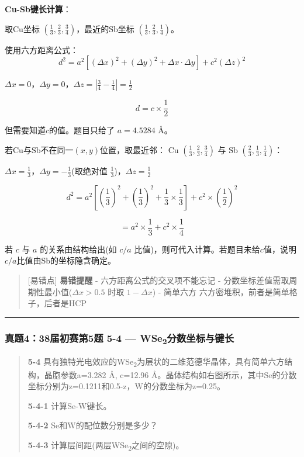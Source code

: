 \textbf{Cu-Sb键长计算}：

取Cu坐标 \((\frac{1}{3}, \frac{2}{3}, \frac{3}{4})\)，最近的Sb坐标 \((\frac{1}{3}, \frac{2}{3}, \frac{1}{4})\)。

使用六方距离公式：
\[d^2 = a^2[(\Delta x)^2 + (\Delta y)^2 + \Delta x \cdot \Delta y] + c^2(\Delta z)^2\]

\(\Delta x = 0\)，\(\Delta y = 0\)，\(\Delta z = |\frac{3}{4} - \frac{1}{4}| = \frac{1}{2}\)

\[d = c \times \frac{1}{2}\]

但需要知道\(c\)的值。题目只给了 \(a = 4.5284\) Å。

若Cu与Sb不在同一\((x,y)\)位置，取最近邻：
Cu \((\frac{1}{3}, \frac{2}{3}, \frac{3}{4})\) 与 Sb \((\frac{2}{3}, \frac{1}{3}, \frac{1}{4})\)：

\(\Delta x = \frac{1}{3}\)，\(\Delta y = -\frac{1}{3}\)(取绝对值 \(\frac{1}{3}\))，\(\Delta z = \frac{1}{2}\)

\[d^2 = a^2\left[(\frac{1}{3})^2 + (\frac{1}{3})^2 + \frac{1}{3} \times \frac{1}{3}\right] + c^2 \times (\frac{1}{2})^2\]

\[= a^2 \times \frac{1}{3} + c^2 \times \frac{1}{4}\]

若 \(c\) 与 \(a\) 的关系由结构给出(如 \(c/a\) 比值)，则可代入计算。若题目未给\(c\)值，说明\(c/a\)比值由Sb的坐标隐含确定。

\begin{quote}
{[}易错点{]} \textbf{易错提醒}
- 六方距离公式的交叉项不能忘记
- 分数坐标差值需取周期性最小值(\(\Delta x > 0.5\) 时取 \(1 - \Delta x\))
- 简单六方  六方密堆积，前者是简单格子，后者是HCP
\end{quote}

\begin{center}\rule{0.5\linewidth}{0.5pt}\end{center}

\subsubsection{\texorpdfstring{真题4：38届初赛第5题 5-4 --- WSe\textsubscript{2}分数坐标与键长}{真题4：38届初赛第5题 5-4 --- WSe2分数坐标与键长}}\label{ux771fux9898438ux5c4aux521dux8d5bux7b2c5ux9898-5-4-wse2ux5206ux6570ux5750ux6807ux4e0eux952eux957f}

\begin{quote}
\textbf{5-4} 具有独特光电效应的WSe\textsubscript{2}为层状的二维范德华晶体，具有简单六方结构，晶胞参数a=3.282 Å, c=12.96 Å。晶体结构如右图所示，其中Se的分数坐标分别为z=0.1211和0.5-z，W的分数坐标为z=0.25。

\textbf{5-4-1} 计算Se-W键长。

\textbf{5-4-2} Se和W的配位数分别是多少？

\textbf{5-4-3} 计算层间距(两层WSe\textsubscript{2}之间的空隙)。
\end{quote}

